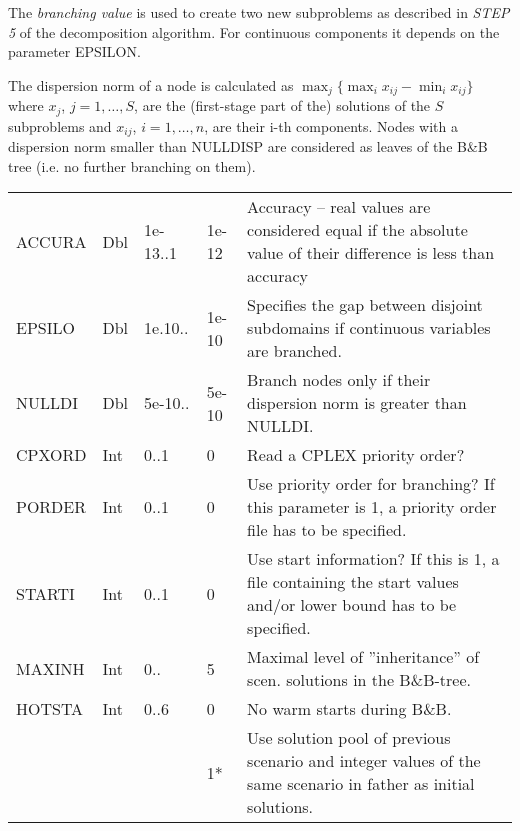 \documentclass[11pt,draft]{article}
\newcommand{\+}{{\ti{+}}}
\newcommand{\1}{{\ti{1}}}
\begin{document}
The {\it branching value} is used to create two new subproblems as described in {\em STEP 5} of the
decomposition algorithm. For continuous components it depends on the parameter EPSILON.

The dispersion norm of a node is calculated as $\max_{j}  \{  \max_{i}
x_{ij} - \min_{i} x_{ij}\}$ where $x_j$, $j=1,\ldots,S$, are the (first-stage part of the) solutions
of the $S$ subproblems and $x_{ij}$, $i=1,\ldots,n$, are their i-th components.
Nodes with a dispersion norm smaller than NULLDISP are considered as leaves of the 
B\&B tree (i.e. no further branching on them).
\begin{center}
\tablelasttail{\hline}
\begin{supertabular}{|llllp{6.2cm}|} 
ACCURA&Dbl&1e-13..1&1e-12& Accuracy -- real values are considered equal if the absolute value of their difference is less than accuracy\\[0.2em]
EPSILO&Dbl&1e.10..&1e-10&Specifies the gap between disjoint subdomains if continuous variables are branched.\\[0.2em]
NULLDI&Dbl&5e-10..&5e-10&Branch nodes only if their dispersion norm is greater than NULLDI.\\[0.2em]
CPXORD&Int&0..1&0&Read a CPLEX priority order?\\[0.2em]
PORDER&Int&0..1&0&Use priority order for branching? If this
parameter is 1, a priority order file has to be specified. \\[0.2em]
STARTI&Int&0..1&0&Use start information? If this is 1, a file
  containing the start values and/or lower bound has to be specified.\\[0.2em]
MAXINH&Int&0..&5&Maximal level of ''inheritance'' of scen. solutions in the B\&B-tree.\\[0.2em]
HOTSTA&Int&0..6&0&No warm starts during B\&B.\\
&&&1*&Use solution pool of previous scenario and integer values of the same scenario in father as initial solutions.\\

\end{supertabular}
\end{center}
\end{document}
